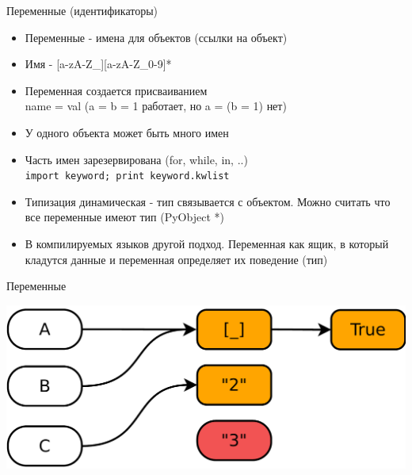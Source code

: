 \documentclass{article}
\begin{document}
\LARGE

\begin{center} Переменные (идентификаторы) \end{center}
\begin{itemize}
	\item Переменные - имена для объектов (ссылки на объект)
	\item Имя - [a-zA-Z\_][a-zA-Z\_0-9]*
	\item Переменная создается присваиванием \\ name = val (a = b = 1 работает, но a = (b = 1) нет)
	\item У одного объекта может быть много имен
	\item Часть имен зарезервирована (for, while, in, ..) \\
			\lstinline!import keyword; print keyword.kwlist!
	\item Типизация динамическая - тип связывается с объектом.
		  Можно считать что все переменные имеют тип (PyObject *)
	\item В компилируемых языков другой подход. Переменная как ящик, 
		  в который кладутся данные и переменная определяет их поведение (тип)
\end{itemize}
\newpage

\begin{center} Переменные \end{center}
\begin{center} \includegraphics[scale=0.4]{images/vars.pdf} \end{center}
\newpage
\end{document}
